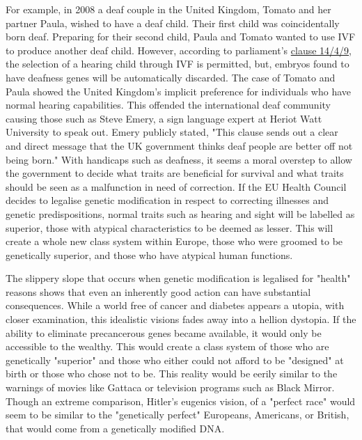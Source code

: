    For example, in 2008 a deaf couple in the United Kingdom, Tomato and
   her partner Paula, wished to have a deaf child. Their first child was
   coincidentally born deaf. Preparing for their second child, Paula and
   Tomato wanted to use IVF to produce another deaf child. However,
   according to parliament's \href{https://www.theguardian.com/science/2008/mar/09/genetics.medicalresearch}{clause 14/4/9}, the selection of a hearing
   child through IVF is permitted, but, embryos found to have deafness
   genes will be automatically discarded. The case of Tomato and Paula
   showed the United Kingdom's implicit preference for individuals who
   have normal hearing capabilities. This offended the international deaf
   community causing those such as Steve Emery, a sign language expert at
   Heriot Watt University to speak out. Emery publicly stated, "This
   clause sends out a clear and direct message that the UK government
   thinks deaf people are better off not being born." With handicaps such
   as deafness, it seems a moral overstep to allow the government to
   decide what traits are beneficial for survival and what traits should
   be seen as a malfunction in need of correction. If the EU Health
   Council decides to legalise genetic modification in respect to
   correcting illnesses and genetic predispositions, normal traits such as
   hearing and sight will be labelled as superior, those with atypical
   characteristics to be deemed as lesser. This will create a whole new
   class system within Europe, those who were groomed to be genetically
   superior, and those who have atypical human functions.

   The slippery slope that occurs when genetic modification is legalised
   for "health" reasons shows that even an inherently good action can have
   substantial consequences. While a world free of cancer and diabetes
   appears a utopia, with closer examination, this idealistic visions
   fades away into a hellion dystopia. If the ability to eliminate
   precancerous genes became available, it would only be accessible to the
   wealthy. This would create a class system of those who are genetically
   "superior" and those who either could not afford to be "designed" at
   birth or those who chose not to be. This reality would be eerily
   similar to the warnings of movies like Gattaca or television programs
   such as Black Mirror. Though an extreme comparison, Hitler's eugenics
   vision, of a "perfect race" would seem to be similar to the
   "genetically perfect" Europeans, Americans, or British, that would come
   from a genetically modified DNA.

